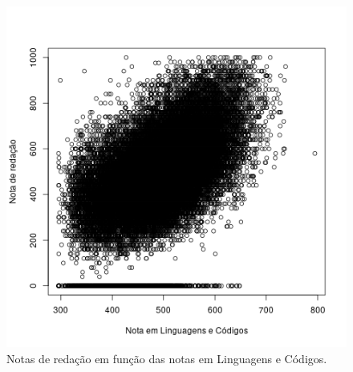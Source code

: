 \documentclass[12pt]{article}
\begin{document}
\vspace{2cm}

\begin{minipage}{.5\textwidth}
    \begin{figure}[H]
    \centering\includegraphics[width=\linewidth]{../correlacao_nota_lc.png}
    \caption{Notas de redação em função das notas em Linguagens e Códigos.}
    \label{fig:correlacao-nota-lc}
    \end{figure}
\end{minipage}%
\end{document}
